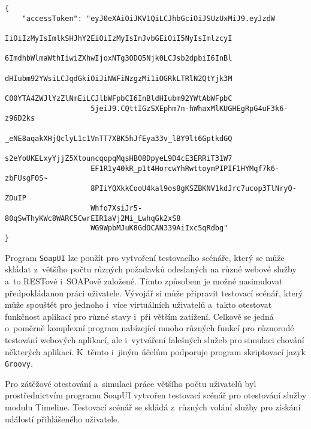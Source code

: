 \documentclass[twoside, 12pt]{article}
\begin{document}
{{\vspace{10}


\begin{lstlisting}
{
    "accessToken": "eyJ0eXAiOiJKV1QiLCJhbGciOiJSUzUxMiJ9.eyJzdW
                    IiOiIzMyIsImlkSHJhY2EiOiIzMyIsInJvbGEiOiI5NyIsImlzcyI
                    6ImdhbWlmaWthIiwiZXhwIjoxNTg3ODQ5Njk0LCJsb2dpbiI6InBl
                    dHIubm92YWsiLCJqdGkiOiJiNWFiNzgzMi1iOGRkLTRlN2QtYjk3M
                    C00YTA4ZWJlYzZlNmEiLCJlbWFpbCI6InBldHIubm92YWtAbWFpbC
                    5jeiJ9.CQttIGzSXEphm7n-hWhaxMlKUGHEgRpG4uF3k6-z96D2ks
                    _eNE8aqakXHjQclyL1c1VnTT7XBK5hJfEya33v_lBY9lt6GptkdGQ
                    s2eYoUKELxyYjjZ5XtouncqopqMqsHB08DpyeL9D4cE3ERRiT31W7
                    EF1R1y40kR_p1t4HorcwYhRwttoymPIPIF1HYMqf7k6-zbFUsgF0S~
                    8PIiYQXkkCooU4kal9os8gKSZBKNV1kdJrc7ucop3TlNryQ-ZDuIP
                    Whfo7XsiJr5-80qSwThyKWc8WARC5CwrEIR1aVj2Mi_LwhqGk2xS8
                    WG9WpbMJuK8GdOCAN339AiIxc5qRdbg"
}
\end{lstlisting}


\vspace{10}


Program \texttt{SoapUI} lze použít pro vytvoření testovacího scénáře,
který se může skládat z~většího počtu různých požadavků odeslaných na různé webové služby a~to RESTové i~SOAPově založené. Tímto způsobem je možné nasimulovat předpokládanou práci uživatele.
Vývojář si může připravit testovací scénář, který může spouštět pro jednoho i~více virtuálních uživatelů a~takto otestovat funkčnost aplikací pro různé stavy i~při větším zatížení.
Celkově se jedná o~poměrně komplexní program nabízející mnoho různých funkcí
pro různorodé testování webových aplikací, ale i~vytváření falešných služeb pro simulaci
chování některých aplikací.
K~těmto i~jiným účelům podporuje program skriptovací jazyk \texttt{Groovy}.

Pro zátěžové otestování a~simulaci práce většího počtu uživatelů byl prostřednictvím
programu SoapUI vytvořen testovací scénář pro otestování služby modulu Timeline.
Testovací scénář se skládá z~různých volání služby pro získání událostí přihlášeného uživatele.

\vspace{10}


}}
\end{document}
